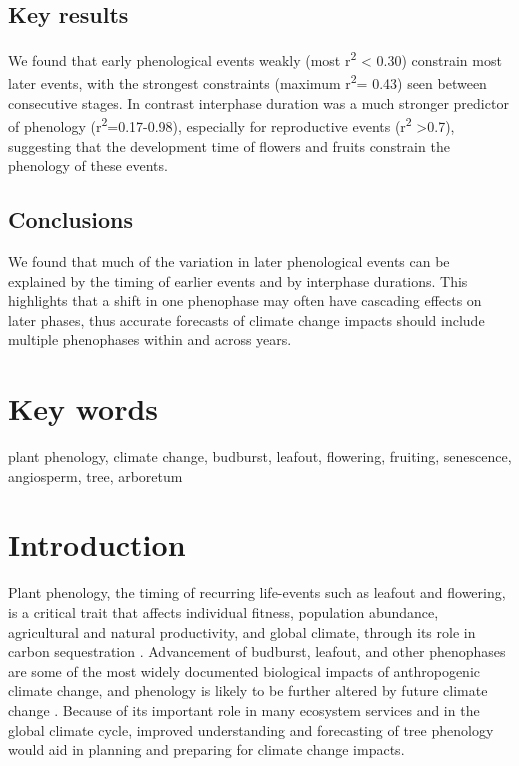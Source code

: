 \documentclass{article}
\begin{document}
\subsection*{Key results}
We found that early phenological events weakly (most r\textsuperscript{2} < 0.30) constrain most later events, with the strongest constraints (maximum r\textsuperscript{2}= 0.43) seen between consecutive stages. In contrast interphase duration was a much stronger predictor of phenology (r\textsuperscript{2}=0.17-0.98), especially for reproductive events (r\textsuperscript{2} >0.7), suggesting that the development time of flowers and fruits constrain the phenology of these events.
\subsection*{Conclusions}
We found that much of the variation in later phenological events can be explained by the timing of earlier events and by interphase durations. This highlights that a shift in one phenophase may often have cascading effects on later phases, thus accurate forecasts of climate change impacts should include multiple phenophases within and across years. %

\section* {Key words}
plant phenology, climate change, budburst, leafout, flowering, fruiting, senescence, angiosperm, tree, arboretum
\section* {Introduction}
Plant phenology, the timing of recurring life-events such as leafout and flowering, is a critical trait that affects individual fitness, population abundance, agricultural and natural productivity, and global climate, through its role in carbon sequestration \citep{chuine2001,cleland2007,willis2010,miller-rushing2010,craine2012}. Advancement of budburst, leafout, and other phenophases are some of the most widely documented biological impacts of anthropogenic climate change, and phenology is likely to be further altered by future climate change \citep{parmesan2006}. Because of its important role in many ecosystem services and in the global climate cycle, improved understanding and forecasting of tree phenology would aid in planning and preparing for climate change impacts.
\end{document}
